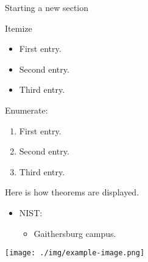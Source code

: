 
\begin{sectionslide}
  Starting a new section
\end{sectionslide}


\begin{subsectionslide}
  Itemize

  \begin{itemize}
    \item First entry.
    \item Second entry.
    \item Third entry.
  \end{itemize}

  Enumerate:

  \begin{enumerate}
    \item First entry.
    \item Second entry.
    \item Third entry.
  \end{enumerate}
\end{subsectionslide}


\begin{subsectionslide}
  \begin{theorem}[Example]
    Here is how theorems are displayed.
  \end{theorem}
\end{subsectionslide}


\begin{subsectionslide}
  \begin{minipage}[h!]{0.45\textwidth}
    \begin{itemize}
      \item NIST:
      \begin{itemize}
        \item Gaithersburg campus.
      \end{itemize}
    \end{itemize}
  \end{minipage}\hfill
  \begin{minipage}[h!]{0.45\textwidth}
    \texttt{[image: ./img/example-image.png]}
  \end{minipage}
\end{subsectionslide}

